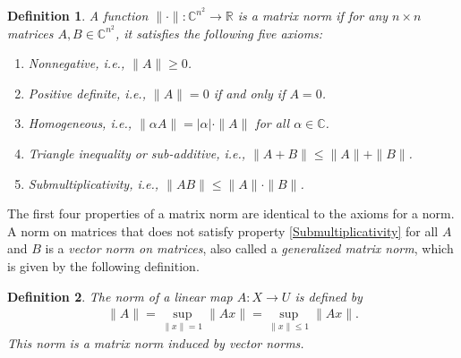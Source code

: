 \documentclass[11pt]{book}
\newtheorem{definition}{Definition}[section]
\theoremstyle{definition}
\numberwithin{equation}{chapter}
\begin{document}
\begin{definition}{\rm \cite{39}}\label{matrix_norm_def}
A function $\|\cdot \|: \mathbb{C}^{n^2} \to \mathbb{R}$ is a matrix norm if for any $n \times n$ matrices $A, B \in \mathbb{C}^{n^2}$, it satisfies the following five axioms:
\begin{enumerate}[label=(\arabic*)]
    \item Nonnegative, i.e., $\|A\| \geq 0$.
    
    \item Positive definite, i.e., $\|A\| = 0$ if and only if $A = 0$.
    
    \item Homogeneous, i.e., $\|\alpha A\| = |\alpha| \cdot \|A\|$ for all $\alpha \in \mathbb{C}$.
    
    \item Triangle inequality or sub-additive, i.e., $\|A + B\| \leq \|A\| + \|B\|$.
    
    \item Submultiplicativity, i.e., $\|A B\| \leq \|A\| \cdot \|B\|$. \label{Submultiplicativity}
\end{enumerate}
\end{definition}

The first four properties of a matrix norm are identical to the axioms for a norm. A norm on matrices that does not
satisfy property \ref{Submultiplicativity} for all $A$ and $B$ is a {\em vector norm on matrices}, also called a {\em generalized matrix norm}, which is given by the following definition.

\medskip

\begin{definition}\label{vector_norm_matrix_def}
The norm of a linear map $A:X\to U$ is defined by
\begin{align*}
    \|A\| = \sup_{\|x\| = 1} \|Ax\| = \sup_{\|x\| \leq 1} \|Ax\|.
\end{align*}
This norm is a matrix norm induced by vector norms.
\end{definition}

\medskip
\end{document}
